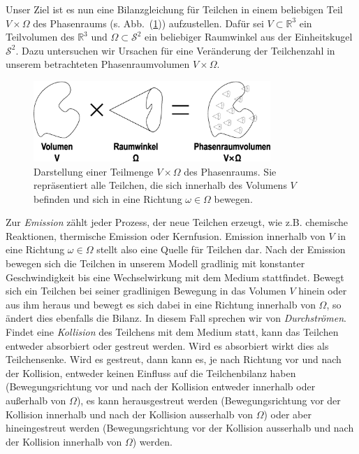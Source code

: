 	Unser Ziel ist es nun eine Bilanzgleichung für Teilchen in einem beliebigen Teil $V \times \Omega$ des Phasenraums (s. Abb.~(\ref{fig:phasespacevolume})) aufzustellen. Dafür sei $V \subset \mathbb{R}^3$ ein Teilvolumen des $\mathbb{R}^3$ und $\Omega \subset \mathcal{S}^2$ ein beliebiger Raumwinkel aus der Einheitskugel $\mathcal{S}^2$. Dazu untersuchen wir Ursachen für eine Veränderung der Teilchenzahl in unserem betrachteten Phasenraumvolumen $V \times \Omega$.
	\begin{figure}
		\centering
		\includegraphics[width=0.8\textwidth]{phasespacevolume.eps}
		\caption{Darstellung einer Teilmenge $V \times \Omega$ des Phasenraums. Sie repräsentiert alle Teilchen, die sich innerhalb des Volumens $V$ befinden und sich in eine Richtung $\omega\in\Omega$ bewegen.}
		\label{fig:phasespacevolume}
	\end{figure}

	Zur {\em Emission} zählt jeder Prozess, der neue Teilchen erzeugt, wie z.B. chemische Reaktionen, thermische Emission oder Kernfusion. Emission innerhalb von $V$ in eine Richtung $\omega\in\Omega$ stellt also eine Quelle für Teilchen dar. Nach der Emission bewegen sich die Teilchen in unserem Modell gradlinig mit konstanter Geschwindigkeit bis eine Wechselwirkung mit dem Medium stattfindet. Bewegt sich ein Teilchen bei seiner gradlinigen Bewegung in das Volumen $V$ hinein oder aus ihm heraus und bewegt es sich dabei in eine Richtung innerhalb von $\Omega$, so ändert dies ebenfalls die Bilanz. In diesem Fall sprechen wir von {\em Durchströmen}. Findet eine {\em Kollision} des Teilchens mit dem Medium statt, kann das Teilchen entweder absorbiert oder gestreut werden. Wird es absorbiert wirkt dies als Teilchensenke. Wird es gestreut, dann kann es, je nach Richtung vor und nach der Kollision, entweder keinen Einfluss auf die Teilchenbilanz haben (Bewegungsrichtung vor und nach der Kollision entweder innerhalb oder außerhalb von $\Omega$), es kann herausgestreut werden (Bewegungsrichtung vor der Kollision innerhalb und nach der Kollision ausserhalb von $\Omega$) oder aber hineingestreut werden (Bewegungsrichtung vor der Kollision ausserhalb und nach der Kollision innerhalb von $\Omega$) werden.
	
